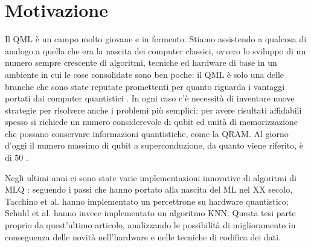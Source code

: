 
\section{Motivazione}

Il \ac{QML} è un campo molto giovane e in fermento. Stiamo assistendo a qualcosa di 
analogo a quella che era la nascita dei computer classici, ovvero lo sviluppo di un 
numero sempre crescente di algoritmi, tecniche ed hardware di base in 
un ambiente in cui le cose consolidate sono ben poche: il \ac{QML} è solo una 
delle branche che sono state reputate promettenti per quanto riguarda i vantaggi 
portati dai computer quantistici \cite{what-is-ibm-q}. 
In ogni caso c'è necessità di inventare nuove strategie per risolvere anche i 
problemi più semplici: per avere risultati affidabili spesso si richiede un 
numero considerevole di qubit ed unità di memorizzazione che possano conservare 
informazioni quantistiche, come la \ac{QRAM}. 
Al giorno d'oggi il numero massimo di qubit a superconduzione, da quanto viene 
riferito, è di 50 \cite{50qubit}. 

Negli ultimi anni ci sono state varie implementazioni innovative di algoritmi di \ac{MLQ} \cite{quantum-advantage}: 
seguendo i passi che hanno portato alla nascita del \ac{ML} nel XX secolo, 
Tacchino et al. \cite{tacchino} hanno implementato un percettrone su hardware quantistico;
Schuld et al. \cite{schuld} hanno invece implementato un algoritmo \ac{KNN}. 
Questa tesi parte proprio da quest'ultimo articolo, analizzando le possibilità di 
miglioramento in conseguenza delle novità nell'hardware e nelle tecniche di codifica dei dati. 


